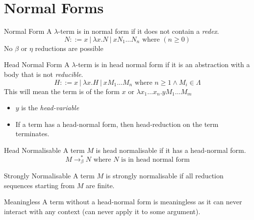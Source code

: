 \section{Normal Forms}
\begin{definitionbox}{Normal Form}
	A $\lambda$-term is in normal form if it does not contain a \textit{redex}.
	\[N ::= x \ | \ \lambda x . N \ | \ x N_1 \dots N_n \text{ where }(n \geq 0)\]
	No $\beta$ or $\eta$ reductions are possible
\end{definitionbox}

\begin{definitionbox}{Head Normal Form}
	A $\lambda$-term is in head normal form if it is an abstraction with a body that is not \textit{reducible}.
	\[H ::= x \ | \ \lambda x. H \ | \ x M_1 \dots M_n \text{ where } n \geq 1 \land M_i \in \Lambda \]
	This will mean the term is of the form $x$ or $\lambda x_1 \dots x_n . y M_1 \dots M_m$
	\begin{itemize}
		\item $y$ is the \textit{head-variable}
		\item If a term has a head-normal form, then head-reduction on the term terminates.
	\end{itemize}
\end{definitionbox}

\begin{tcbraster}[raster columns=2, raster equal height]
	\begin{definitionbox}{Head Normalisable}
		A term $M$ is head normalisable if it has a head-normal form.
		\[M \to^*_\beta N \text{ where } N \text{ is in head normal form}\]
	\end{definitionbox}
	\begin{definitionbox}{Strongly Normalisable}
		A term $M$ is strongly normalisable if all reduction sequences starting from $M$ are finite.
	\end{definitionbox}
\end{tcbraster}
\begin{definitionbox}{Meaningless}
	A term without a head-normal form is meaningless as it can never interact with any context (can never apply it to some argument).
\end{definitionbox}

